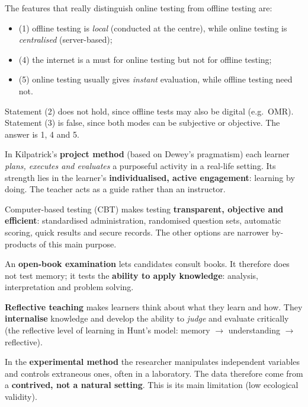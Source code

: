 The features that really distinguish online testing from offline testing are:
\begin{itemize}
\item (1) offline testing is \emph{local} (conducted at the centre), while online testing is \emph{centralised} (server-based);
\item (4) the internet is a must for online testing but not for offline testing;
\item (5) online testing usually gives \emph{instant} evaluation, while offline testing need not.
\end{itemize}
Statement (2) does not hold, since offline tests may also be digital (e.g.\ OMR). Statement (3) is false, since both modes can be subjective or objective. The answer is 1, 4 and 5.

In Kilpatrick's \textbf{project method} (based on Dewey's pragmatism) each learner \emph{plans, executes and evaluates} a purposeful activity in a real-life setting. Its strength lies in the learner's \textbf{individualised, active engagement}: learning by doing. The teacher acts as a guide rather than an instructor.

Computer-based testing (CBT) makes testing \textbf{transparent, objective and efficient}: standardised administration, randomised question sets, automatic scoring, quick results and secure records. The other options are narrower by-products of this main purpose.

An \textbf{open-book examination} lets candidates consult books. It therefore does not test memory; it tests the \textbf{ability to apply knowledge}: analysis, interpretation and problem solving.

\textbf{Reflective teaching} makes learners think about what they learn and how. They \textbf{internalise} knowledge and develop the ability to \emph{judge} and evaluate critically (the reflective level of learning in Hunt's model: memory $\rightarrow$ understanding $\rightarrow$ reflective).

In the \textbf{experimental method} the researcher manipulates independent variables and controls extraneous ones, often in a laboratory. The data therefore come from a \textbf{contrived, not a natural setting}. This is its main limitation (low ecological validity).

